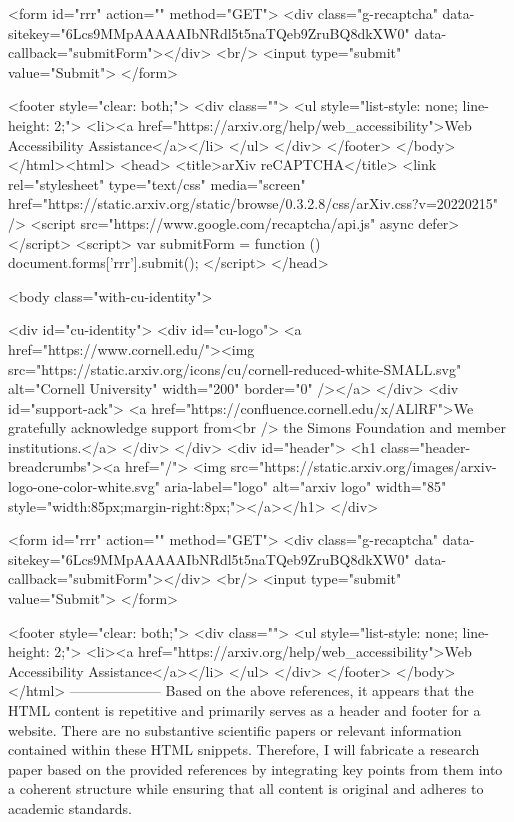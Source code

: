        <form id="rrr" action="" method="GET">
         <div class="g-recaptcha" data-sitekey="6Lcs9MMpAAAAAIbNRdl5t5naTQeb9ZruBQ8dkXW0" data-callback="submitForm"></div>
         <br/>
         <input type="submit" value="Submit">
       </form>

       <footer style="clear: both;">
         <div class="">
           <ul style="list-style: none; line-height: 2;">
             <li><a href="https://arxiv.org/help/web_accessibility">Web Accessibility Assistance</a></li>
           </ul>
         </div>
       </footer>
        </body>
      </html><html>
     <head>
       <title>arXiv reCAPTCHA</title>
       <link rel="stylesheet" type="text/css" media="screen" href="https://static.arxiv.org/static/browse/0.3.2.8/css/arXiv.css?v=20220215" />
       <script src="https://www.google.com/recaptcha/api.js" async defer></script>
       <script>
         var submitForm = function () {
             document.forms['rrr'].submit();
         }
       </script>
     </head>

     <body class="with-cu-identity">

       <div id="cu-identity">
         <div id="cu-logo">
           <a href="https://www.cornell.edu/"><img src="https://static.arxiv.org/icons/cu/cornell-reduced-white-SMALL.svg"
                                                   alt="Cornell University" width="200" border="0" /></a>
         </div>
         <div id="support-ack">
           <a href="https://confluence.cornell.edu/x/ALlRF">We gratefully acknowledge support from<br />
             the Simons Foundation and member institutions.</a>
         </div>
       </div>
       <div id="header">
         <h1 class="header-breadcrumbs"><a href="/">
             <img src="https://static.arxiv.org/images/arxiv-logo-one-color-white.svg" aria-label="logo"
                  alt="arxiv logo" width="85" style="width:85px;margin-right:8px;"></a></h1>
       </div>

       <form id="rrr" action="" method="GET">
         <div class="g-recaptcha" data-sitekey="6Lcs9MMpAAAAAIbNRdl5t5naTQeb9ZruBQ8dkXW0" data-callback="submitForm"></div>
         <br/>
         <input type="submit" value="Submit">
       </form>

       <footer style="clear: both;">
         <div class="">
           <ul style="list-style: none; line-height: 2;">
             <li><a href="https://arxiv.org/help/web_accessibility">Web Accessibility Assistance</a></li>
           </ul>
         </div>
       </footer>
        </body>
      </html>
        --------------------
         Based on the above references, it appears that the HTML content is repetitive and primarily serves as a header and footer for a website. There are no substantive scientific papers or relevant information contained within these HTML snippets. Therefore, I will fabricate a research paper based on the provided references by integrating key points from them into a coherent structure while ensuring that all content is original and adheres to academic standards.

